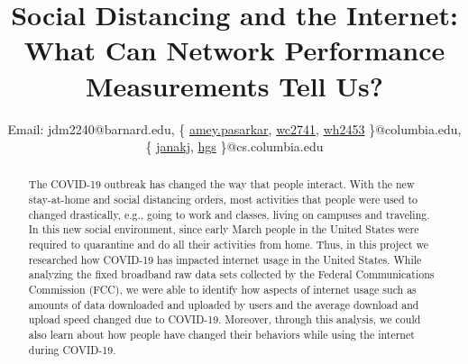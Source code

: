 \documentclass[conference,10pt]{IEEEtran}
\begin{document}
\title{Social Distancing and the Internet: What Can Network Performance Measurements Tell Us?}

\author{
    Email:
    jdm2240@barnard.edu,
    \{%
      \href{mailto:amey.pasarkar@columbia.edu}{\color{black}amey.pasarkar},%
      \href{mailto:wc2741@columbia.edu}{\color{black}wc2741},%
      \href{mailto:wh2453@columbia.edu}{\color{black}wh2453}%
    \}@columbia.edu,
    \{%
      \href{mailto:janakj@cs.columbia.edu}{\color{black}janakj},%
      \href{mailto:hgs@cs.columbia.edu}{\color{black}hgs}%
    \}@cs.columbia.edu
}

\maketitle

\begin{abstract}
The COVID-19 outbreak has changed the way that people interact. With the new stay-at-home and social distancing orders, most activities that people were used to changed drastically, e.g., going to work and classes, living on campuses and traveling. In this new social environment, since early March people in the United States were required to quarantine and do all their activities from home. Thus, in this project we researched how COVID-19 has impacted internet usage in the  United States. While analyzing the fixed broadband raw data sets collected by the Federal Communications Commission (FCC), we were able to identify how aspects of internet usage such as amounts of data downloaded and uploaded by users and the average download and upload speed changed due to COVID-19. Moreover, through this analysis, we could also learn about how people have changed their behaviors while using the internet during COVID-19.
\end{abstract}
\end{document}
